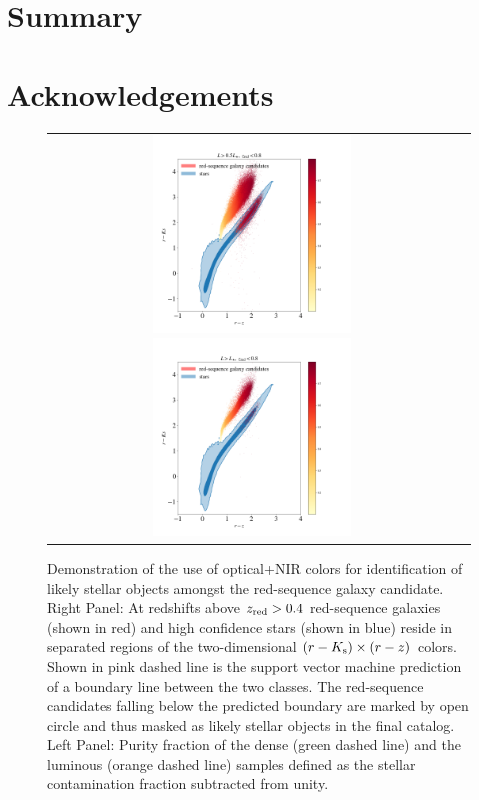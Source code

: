 \documentclass[fleqn,usenatbib,useAMS]{mnras}
\begin{document}
\section{Summary}\label{sec:summary} 





\section*{Acknowledgements}


\begin{figure}
\begin{tabular}{cc}
\includegraphics[width=0.5\textwidth]{figures_tmp/red_vs_star_dense.png}
\includegraphics[width=0.5\textwidth]{figures_tmp/red_vs_star_lum.png}
\end{tabular}
\caption{\label{fig:star_galaxy_I} Demonstration of the use of optical+NIR colors for identification of likely stellar objects amongst the red-sequence galaxy candidate. Right Panel: At redshifts above $z_{\rm red}>0.4$ red-sequence galaxies (shown in red) and high confidence stars (shown in blue) reside in separated regions of the two-dimensional $(r-K_{\rm s}) \times (r-z)$ colors. Shown in pink dashed line is the support vector machine prediction of a boundary line between the two classes. The red-sequence candidates falling below the predicted boundary are marked by open circle and thus masked as likely stellar objects in the final catalog. Left Panel: Purity fraction of the dense  (green dashed line) and the luminous (orange dashed line) samples defined as the stellar contamination fraction subtracted from unity.} 
\end{figure}
\end{document}
